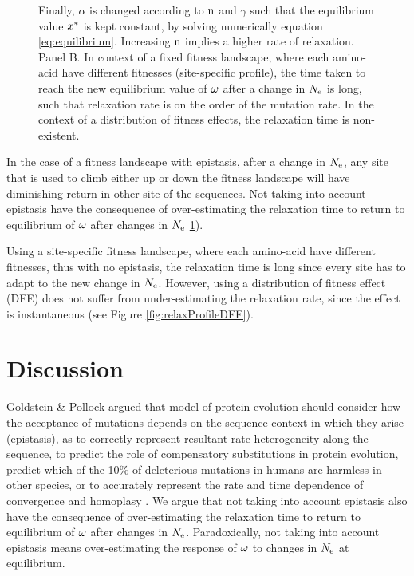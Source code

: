 \documentclass{article}
\begin{document}
\begin{figure}[htb!]
\begin{mdframed}
{		Finally, $\alpha$ is changed according to $\text{n}$ and $\gamma$ such that the equilibrium value $x^{*}$ is kept constant, by solving numerically equation \ref{eq:equilibrium}.
		Increasing $\text{n}$ implies a higher rate of relaxation.
		Panel B.  In context of a fixed fitness landscape, where each amino-acid have different fitnesses (site-specific profile), the time taken to reach the new equilibrium value of $\omega$ after a change in $N_{\mathrm{e}}$ is long, such that relaxation rate is on the order of the mutation rate. In the context of a distribution of fitness effects, the relaxation time is non-existent.
	}
	\label{fig:relaxStability}
\end{mdframed}
\end{figure}
In the case of a fitness landscape with epistasis, after a change in $N_{\mathrm{e}}$, any site that is used to climb either up or down the fitness landscape will have diminishing return in other site of the sequences.
Not taking into account epistasis have the consequence of over-estimating the relaxation time to return to equilibrium of $\omega$ after changes in $N_{\mathrm{e}}$ \ref{fig:relaxStability}).

Using a site-specific fitness landscape, where each amino-acid have different fitnesses, thus with no epistasis, the relaxation time is long since every site has to adapt to the new change in $N_{\mathrm{e}}$.
However, using a distribution of fitness effect (DFE) does not suffer from under-estimating the relaxation rate, since the effect is instantaneous (see Figure \ref{fig:relaxProfileDFE}).

\section*{Discussion}

Goldstein \& Pollock argued that model of protein evolution should consider how the acceptance of mutations depends on the sequence context in which they arise (epistasis), as to correctly represent resultant rate heterogeneity along the sequence, to predict the role of compensatory substitutions in protein evolution, predict which of the 10\% of deleterious mutations in humans are harmless in other species, or to accurately represent the rate and time dependence of convergence and homoplasy \cite{Goldstein2017}.
We argue that not taking into account epistasis also have the consequence of over-estimating the relaxation time to return to equilibrium of $\omega$ after changes in $N_{\mathrm{e}}$.
Paradoxically, not taking into account epistasis means over-estimating the response of $\omega$ to changes in $N_{\mathrm{e}}$ at equilibrium.\\
\end{document}
